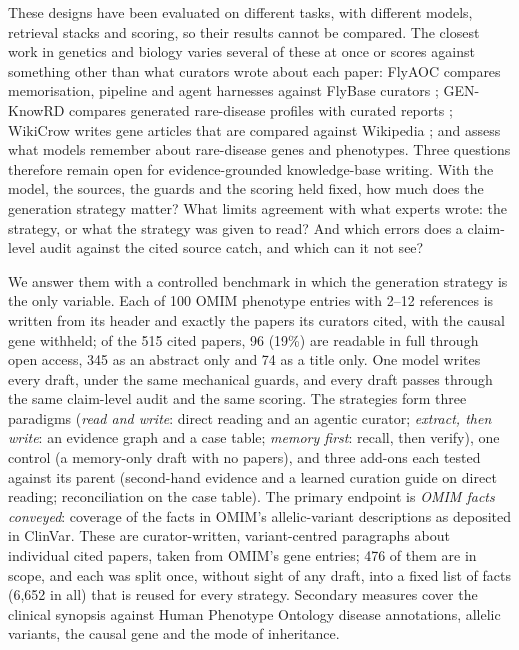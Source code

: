 \documentclass{article} %
\begin{document}
These designs have been evaluated on different tasks, with different models, retrieval stacks and scoring, so their results cannot be compared. The closest work in genetics and biology varies several of these at once or scores against something other than what curators wrote about each paper: FlyAOC compares memorisation, pipeline and agent harnesses against FlyBase curators \citep{zhang2026flyaoc}; GEN-KnowRD compares generated rare-disease profiles with curated reports \citep{yan2026genknowrd}; WikiCrow writes gene articles that are compared against Wikipedia \citep{skarlinski2024language}; and \citet{groza2026systematic} assess what models remember about rare-disease genes and phenotypes. Three questions therefore remain open for evidence-grounded knowledge-base writing. With the model, the sources, the guards and the scoring held fixed, how much does the generation strategy matter? What limits agreement with what experts wrote: the strategy, or what the strategy was given to read? And which errors does a claim-level audit against the cited source catch, and which can it not see?

We answer them with a controlled benchmark in which the generation strategy is the only variable. Each of 100 OMIM phenotype entries with 2--12 references is written from its header and exactly the papers its curators cited, with the causal gene withheld; of the 515 cited papers, 96 (19\%) are readable in full through open access, 345 as an abstract only and 74 as a title only. One model writes every draft, under the same mechanical guards, and every draft passes through the same claim-level audit and the same scoring. The strategies form three paradigms (\emph{read and write}: direct reading and an agentic curator; \emph{extract, then write}: an evidence graph and a case table; \emph{memory first}: recall, then verify), one control (a memory-only draft with no papers), and three add-ons each tested against its parent (second-hand evidence and a learned curation guide on direct reading; reconciliation on the case table). The primary endpoint is \emph{OMIM facts conveyed}: coverage of the facts in OMIM's allelic-variant descriptions as deposited in ClinVar. These are curator-written, variant-centred paragraphs about individual cited papers, taken from OMIM's gene entries; 476 of them are in scope, and each was split once, without sight of any draft, into a fixed list of facts (6,652 in all) that is reused for every strategy. Secondary measures cover the clinical synopsis against Human Phenotype Ontology disease annotations, allelic variants, the causal gene and the mode of inheritance.
\end{document}
